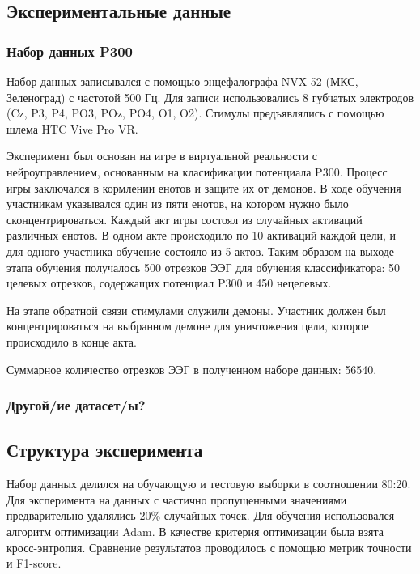 \documentclass{article}
\begin{document}
\subsection{Экспериментальные данные}

\subsubsection{Набор данных P300}

Набор данных записывался с помощью энцефалографа NVX-52 (МКС, Зеленоград) с частотой 500 Гц. Для записи использовались 8 губчатых электродов (Cz, P3, P4, PO3, POz, PO4, O1, O2). Стимулы предъявлялись
с помощью шлема HTC Vive Pro VR.

Эксперимент был основан на игре в виртуальной реальности с нейроуправлением, основанным на класификации потенциала P300. Процесс игры заключался в кормлении енотов и защите их от демонов. В ходе обучения участникам указывался один из пяти енотов, на котором нужно было сконцентрироваться. Каждый акт игры состоял из случайных активаций различных енотов. В одном акте происходило по 10 активаций каждой цели, и для одного участника обучение состояло из 5 актов. Таким образом на выходе этапа обучения получалось 500 отрезков ЭЭГ для обучения классификатора: 50 целевых отрезков, содержащих потенциал P300 и 450 нецелевых.

На этапе обратной связи стимулами служили демоны. Участник должен был концентрироваться на выбранном демоне для уничтожения цели, которое происходило в конце акта.

Суммарное количество отрезков ЭЭГ в полученном наборе данных: 56540.

\subsubsection{Другой/ие датасет/ы?}

\subsection{Структура эксперимента}

Набор данных делился на обучающую и тестовую выборки в соотношении 80:20. Для эксперимента на данных с частично пропущенными значениями предварительно удалялись 20\% случайных точек. Для обучения использовался алгоритм оптимизации Adam. В качестве критерия оптимизации была взята кросс-энтропия. Сравнение результатов проводилось с помощью метрик точности и F1-score. 
\end{document}
